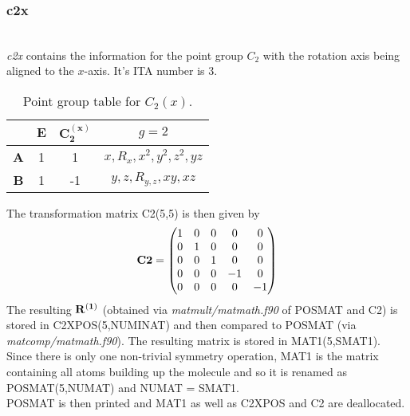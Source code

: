 \documentclass[a4paper,10pt]{scrartcl}
\begin{document}
\subsubsection{c2x}
\\

\emph{c2x} contains the information for the point group $C_{2}$ with the rotation axis being aligned to the $x$-axis. It's ITA number is 3.
\begin{table}[H]
\centering
\caption{Point group table for $C_{2}(x)$.}
\begin{tabular}{c|cc|c}
 & $\bm{E}$ & $\bm{C_{2}^{(x)}}$ & $g=2$ \\\hline
 \bf{A} & 1 & 1 & $x,R_{x}, x^{2}, y^{2}, z^{2}, yz$ \\
 \bf{B} & 1 & -1& $y,z,R_{y,z},xy,xz$\\\hline
\end{tabular}
\end{table}
The transformation matrix C2(5,5) is then given by
\[ \bf{C2} = \begin{pmatrix} 1 & 0 & 0 & 0 & 0 \\
                                  0 & 1 & 0 & 0 & 0 \\
                                  0 & 0 & 1 & 0 & 0 \\
                                  0 & 0 & 0 & -1 & 0 \\
                                  0 & 0 & 0 & 0 & -1
                  \end{pmatrix}\]
The resulting $\bf{R}^{(1)}$ (obtained via \emph{matmult/matmath.f90} of POSMAT and C2) is stored in C2XPOS(5,NUMINAT) and then compared to POSMAT
(via \emph{matcomp/matmath.f90}). The resulting matrix is stored in MAT1(5,SMAT1). Since there is only one non-trivial symmetry operation, MAT1
is the matrix containing all atoms building up the molecule and so it is renamed as POSMAT(5,NUMAT) and NUMAT = SMAT1.\\
POSMAT is then printed and MAT1 as well as C2XPOS and C2 are deallocated.
\end{document}
